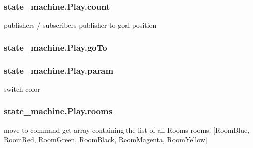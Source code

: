 \subsubsection[{\texorpdfstring{count}{count}}]{\setlength{\rightskip}{0pt plus 5cm}state\+\_\+machine.\+Play.\+count}\hypertarget{classstate__machine_1_1Play_a276faca960b7836501ec5e2f0da038a3}{}\label{classstate__machine_1_1Play_a276faca960b7836501ec5e2f0da038a3}


publishers / subscribers publisher to goal position 

\subsubsection[{\texorpdfstring{go\+To}{goTo}}]{\setlength{\rightskip}{0pt plus 5cm}state\+\_\+machine.\+Play.\+go\+To}\hypertarget{classstate__machine_1_1Play_a9ffb340aab6992abdb021d3a3aa59099}{}\label{classstate__machine_1_1Play_a9ffb340aab6992abdb021d3a3aa59099}
\subsubsection[{\texorpdfstring{param}{param}}]{\setlength{\rightskip}{0pt plus 5cm}state\+\_\+machine.\+Play.\+param}\hypertarget{classstate__machine_1_1Play_a41a074c4bf967a31676ee879b4522e85}{}\label{classstate__machine_1_1Play_a41a074c4bf967a31676ee879b4522e85}


switch color 

\subsubsection[{\texorpdfstring{rooms}{rooms}}]{\setlength{\rightskip}{0pt plus 5cm}state\+\_\+machine.\+Play.\+rooms}\hypertarget{classstate__machine_1_1Play_a1fae7e215371b18cf947e8cd1babb346}{}\label{classstate__machine_1_1Play_a1fae7e215371b18cf947e8cd1babb346}


move to command get array containing the list of all Rooms rooms\+: \mbox{[}\textquotesingle{}Room\+Blue\textquotesingle{}, \textquotesingle{}Room\+Red\textquotesingle{}, \textquotesingle{}Room\+Green\textquotesingle{}, \textquotesingle{}Room\+Black\textquotesingle{}, \textquotesingle{}Room\+Magenta\textquotesingle{}, \textquotesingle{}Room\+Yellow\textquotesingle{}\mbox{]} 

